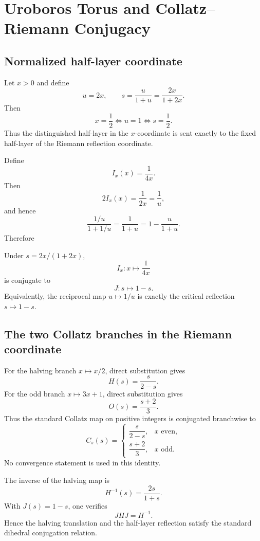 \chapter{Uroboros Torus and Collatz--Riemann Conjugacy}
\label{chap:uroboros-torus}


\section{Normalized half-layer coordinate}

Let \(x>0\) and define
\[
u=2x,\qquad s=\frac{u}{1+u}=\frac{2x}{1+2x}.
\]
Then
\[
\boxed{x=\frac12\iff u=1\iff s=\frac12.}
\]
Thus the distinguished half-layer in the \(x\)-coordinate is sent exactly to the fixed half-layer of the Riemann reflection coordinate.

Define
\[
I_x(x)=\frac{1}{4x}.
\]
Then
\[
2I_x(x)=\frac1{2x}=\frac1u,
\]
and hence
\[
\frac{1/u}{1+1/u}=\frac1{1+u}=1-\frac{u}{1+u}.
\]
Therefore
\begin{theorem}
Under \(s=2x/(1+2x)\),
\[
\boxed{I_x:x\mapsto\frac1{4x}}
\]
is conjugate to
\[
\boxed{J:s\mapsto1-s.}
\]
Equivalently, the reciprocal map \(u\mapsto1/u\) is exactly the critical reflection \(s\mapsto1-s\).
\end{theorem}

\section{The two Collatz branches in the Riemann coordinate}

For the halving branch \(x\mapsto x/2\), direct substitution gives
\[
H(s)=\frac{s}{2-s}.
\]
For the odd branch \(x\mapsto3x+1\), direct substitution gives
\[
O(s)=\frac{s+2}{3}.
\]
Thus the standard Collatz map on positive integers is conjugated branchwise to
\[
\boxed{
C_s(s)=
\begin{cases}
\dfrac{s}{2-s}, & x\text{ even},\\[0.75em]
\dfrac{s+2}{3}, & x\text{ odd}.
\end{cases}}
\]
No convergence statement is used in this identity.

The inverse of the halving map is
\[
H^{-1}(s)=\frac{2s}{1+s}.
\]
With \(J(s)=1-s\), one verifies
\[
\boxed{JHJ=H^{-1}.}
\]
Hence the halving translation and the half-layer reflection satisfy the standard dihedral conjugation relation.

